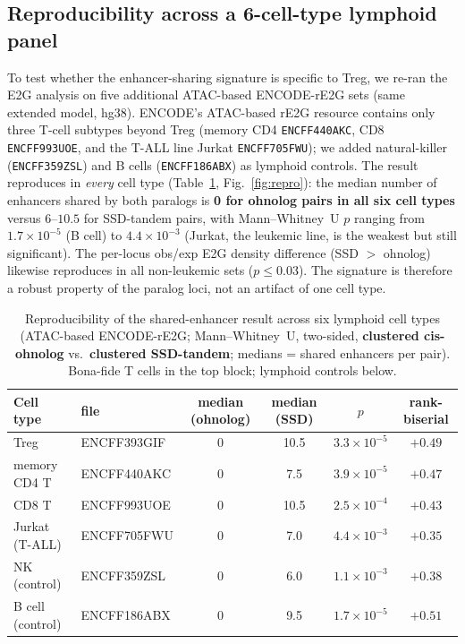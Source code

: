 \documentclass[11pt]{article}
\newcommand{\ohno}{\textcolor{ohno}{\textbf{clustered cis-ohnolog}}}
\newcommand{\ssd}{\textcolor{ssd}{\textbf{clustered SSD-tandem}}}
\begin{document}
\subsection{Reproducibility across a 6-cell-type lymphoid panel}
To test whether the enhancer-sharing signature is specific to Treg, we re-ran the E2G analysis
on five additional ATAC-based ENCODE-rE2G sets (same extended model, hg38). ENCODE's ATAC-based
rE2G resource contains only three T-cell subtypes beyond Treg (memory CD4 \texttt{ENCFF440AKC},
CD8 \texttt{ENCFF993UOE}, and the T-ALL line Jurkat \texttt{ENCFF705FWU}); we added natural-killer
(\texttt{ENCFF359ZSL}) and B cells (\texttt{ENCFF186ABX}) as lymphoid controls. The result
reproduces in \emph{every} cell type (Table~\ref{tab:repro}, Fig.~\ref{fig:repro}): the median
number of enhancers shared by both paralogs is \textbf{0 for ohnolog pairs in all six cell types}
versus $6$--$10.5$ for SSD-tandem pairs, with Mann--Whitney~U $p$ ranging from $1.7\times10^{-5}$
(B cell) to $4.4\times10^{-3}$ (Jurkat, the leukemic line, is the weakest but still significant).
The per-locus obs/exp E2G density difference (SSD $>$ ohnolog) likewise reproduces in all
non-leukemic sets ($p\leq0.03$). The signature is therefore a robust property of the paralog
loci, not an artifact of one cell type.

\begin{table}[H]
\centering
\caption{Reproducibility of the shared-enhancer result across six lymphoid cell types
(ATAC-based ENCODE-rE2G; Mann--Whitney~U, two-sided, \ohno{} vs.\ \ssd{}; medians = shared
enhancers per pair). Bona-fide T cells in the top block; lymphoid controls below.}
\label{tab:repro}
\small
\begin{tabular}{llcccc}
\toprule
Cell type & file & median (ohnolog) & median (SSD) & $p$ & rank-biserial \\
\midrule
Treg              & ENCFF393GIF & 0 & 10.5 & $3.3\times10^{-5}$ & $+0.49$ \\
memory CD4 T      & ENCFF440AKC & 0 & 7.5  & $3.9\times10^{-5}$ & $+0.47$ \\
CD8 T             & ENCFF993UOE & 0 & 10.5 & $2.5\times10^{-4}$ & $+0.43$ \\
Jurkat (T-ALL)    & ENCFF705FWU & 0 & 7.0  & $4.4\times10^{-3}$ & $+0.35$ \\
\midrule
NK (control)      & ENCFF359ZSL & 0 & 6.0  & $1.1\times10^{-3}$ & $+0.38$ \\
B cell (control)  & ENCFF186ABX & 0 & 9.5  & $1.7\times10^{-5}$ & $+0.51$ \\
\bottomrule
\end{tabular}
\end{table}
\end{document}
